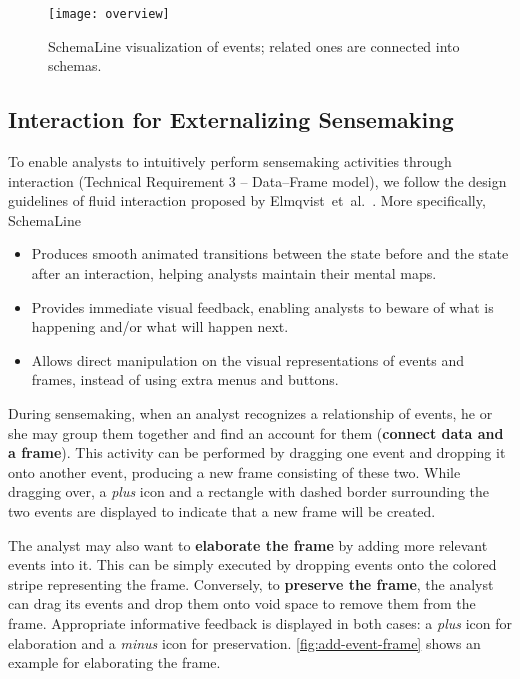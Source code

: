 \begin{figure}
	\centering
	\texttt{[image: overview]}
	\caption[SchemaLine visualization of events]{SchemaLine visualization of events; related ones are connected into schemas.}
	\label{fig:sl-overview}
\end{figure}

\subsection{Interaction for Externalizing Sensemaking}
To enable analysts to intuitively perform sensemaking activities through interaction (Technical Requirement 3 -- Data--Frame model), we follow the design guidelines of fluid interaction proposed by Elmqvist~et~al.~\cite{Elmqvist2011}. More specifically, SchemaLine
\begin{itemize}
	\item Produces smooth animated transitions between the state before and the state after an interaction, helping analysts maintain their mental maps.
	\item Provides immediate visual feedback, enabling analysts to beware of what is happening and/or what will happen next.
	\item Allows direct manipulation on the visual representations of events and frames, instead of using extra menus and buttons.
\end{itemize}

During sensemaking, when an analyst recognizes a relationship of events, he or she may group them together and find an account for them (\textbf{connect data and a frame}). This activity can be performed by dragging one event and dropping it onto another event, producing a new frame consisting of these two. While dragging over, a \emph{plus} icon and a rectangle with dashed border surrounding the two events are displayed to indicate that a new frame will be created.

The analyst may also want to \textbf{elaborate the frame} by adding more relevant events into it. This can be simply executed by dropping events onto the colored stripe representing the frame. Conversely, to \textbf{preserve the frame}, the analyst can drag its events and drop them onto void space to remove them from the frame. Appropriate informative feedback is displayed in both cases: a \emph{plus} icon for elaboration and a \emph{minus} icon for preservation. \autoref{fig:add-event-frame} shows an example for elaborating the frame.

